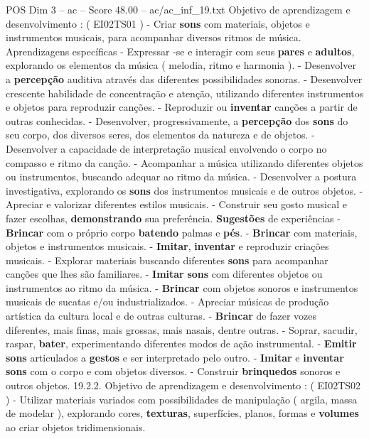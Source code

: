 \begin{textsample}{POS Dim 3 – ac – Score 48.00 – ac/ac\_inf\_19.txt}
Objetivo de aprendizagem e desenvolvimento : ( EI02TS01 ) - Criar \textbf{sons} com materiais, objetos e instrumentos musicais, para acompanhar diversos ritmos de música.
Aprendizagens específicas - Expressar -se e interagir com seus \textbf{pares} e \textbf{adultos}, explorando os elementos da música ( melodia, ritmo e harmonia ). - Desenvolver a \textbf{percepção} auditiva através das diferentes possibilidades sonoras. - Desenvolver crescente habilidade de concentração e atenção, utilizando diferentes instrumentos e objetos para reproduzir canções. - Reproduzir ou \textbf{inventar} canções a partir de outras conhecidas. - Desenvolver, progressivamente, a \textbf{percepção} dos \textbf{sons} do seu corpo, dos diversos seres, dos elementos da natureza e de objetos. - Desenvolver a capacidade de interpretação musical envolvendo o corpo no compasso e ritmo da canção. - Acompanhar a música utilizando diferentes objetos ou instrumentos, buscando adequar ao ritmo da música. - Desenvolver a postura investigativa, explorando os \textbf{sons} dos instrumentos musicais e de outros objetos. - Apreciar e valorizar diferentes estilos musicais. - Construir seu gosto musical e fazer escolhas, \textbf{demonstrando} sua preferência. \textbf{Sugestões} de experiências - \textbf{Brincar} com o próprio corpo \textbf{batendo} palmas e \textbf{pés}. - \textbf{Brincar} com materiais, objetos e instrumentos musicais. - \textbf{Imitar}, \textbf{inventar} e reproduzir criações musicais. - Explorar materiais buscando diferentes \textbf{sons} para acompanhar canções que lhes são familiares. - \textbf{Imitar} \textbf{sons} com diferentes objetos ou instrumentos ao ritmo da música. - \textbf{Brincar} com objetos sonoros e instrumentos musicais de sucatas e/ou industrializados. - Apreciar músicas de produção artística da cultura local e de outras culturas. - \textbf{Brincar} de fazer vozes diferentes, mais finas, mais grossas, mais nasais, dentre outras. - Soprar, sacudir, raspar, \textbf{bater}, experimentando diferentes modos de ação instrumental. - \textbf{Emitir} \textbf{sons} articulados a \textbf{gestos} e ser interpretado pelo outro. - \textbf{Imitar} e \textbf{inventar} \textbf{sons} com o corpo e com objetos diversos. - Construir \textbf{brinquedos} sonoros e outros objetos. 19.2.2.
Objetivo de aprendizagem e desenvolvimento : ( EI02TS02 ) - Utilizar materiais variados com possibilidades de manipulação ( argila, massa de modelar ), explorando cores, \textbf{texturas}, superfícies, planos, formas e \textbf{volumes} ao criar objetos tridimensionais.

\end{textsample}
